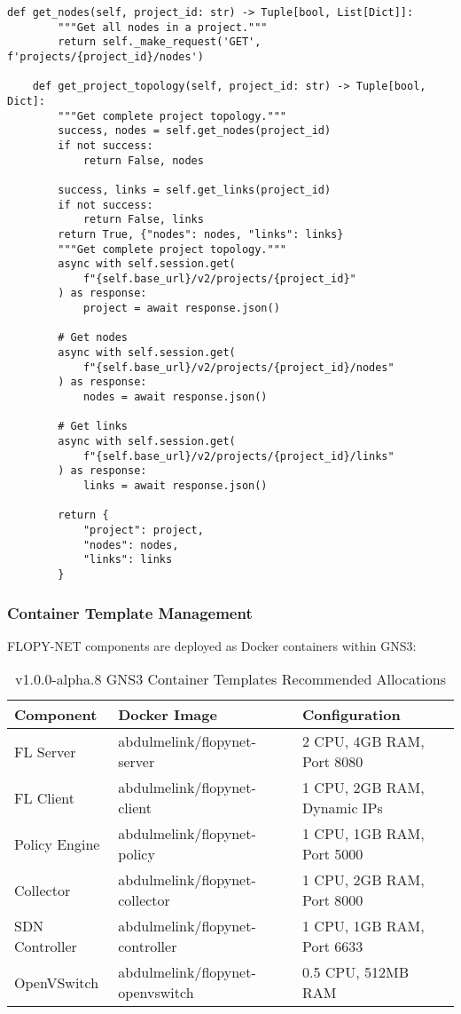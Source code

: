 \begin{lstlisting}[style=pythoncode, caption=GNS3 Integration Client]
    def get_nodes(self, project_id: str) -> Tuple[bool, List[Dict]]:
        """Get all nodes in a project."""
        return self._make_request('GET', f'projects/{project_id}/nodes')
    
    def get_project_topology(self, project_id: str) -> Tuple[bool, Dict]:
        """Get complete project topology."""
        success, nodes = self.get_nodes(project_id)
        if not success:
            return False, nodes
        
        success, links = self.get_links(project_id)
        if not success:
            return False, links        
        return True, {"nodes": nodes, "links": links}
        """Get complete project topology."""
        async with self.session.get(
            f"{self.base_url}/v2/projects/{project_id}"
        ) as response:
            project = await response.json()
        
        # Get nodes
        async with self.session.get(
            f"{self.base_url}/v2/projects/{project_id}/nodes"
        ) as response:
            nodes = await response.json()
        
        # Get links
        async with self.session.get(
            f"{self.base_url}/v2/projects/{project_id}/links"
        ) as response:
            links = await response.json()
        
        return {
            "project": project,
            "nodes": nodes,
            "links": links
        }
\end{lstlisting}

\subsubsection{Container Template Management}

FLOPY-NET components are deployed as Docker containers within GNS3:

\begin{table}[H]
\centering
\caption{v1.0.0-alpha.8 GNS3 Container Templates Recommended Allocations}
\label{tab:gns3-templates}
\begin{tabular}{@{}llp{5cm}@{}}
\toprule
\textbf{Component} & \textbf{Docker Image} & \textbf{Configuration} \\
\midrule
FL Server & abdulmelink/flopynet-server & 2 CPU, 4GB RAM, Port 8080 \\
FL Client & abdulmelink/flopynet-client & 1 CPU, 2GB RAM, Dynamic IPs \\
Policy Engine & abdulmelink/flopynet-policy & 1 CPU, 1GB RAM, Port 5000 \\
Collector & abdulmelink/flopynet-collector & 1 CPU, 2GB RAM, Port 8000 \\
SDN Controller & abdulmelink/flopynet-controller & 1 CPU, 1GB RAM, Port 6633 \\
OpenVSwitch & abdulmelink/flopynet-openvswitch & 0.5 CPU, 512MB RAM \\
\bottomrule
\end{tabular}
\end{table}

